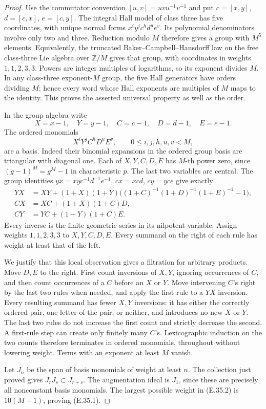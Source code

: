 \begin{proof}
Use the commutator convention $[u,v]=uvu^{-1}v^{-1}$ and put
$c=[x,y]$, $d=[c,x]$, $e=[c,y]$.  The integral Hall model of class
three has five coordinates, with unique normal forms
$x^iy^jc^hd^ue^v$.  Its polynomial denominators involve only two and
three.  Reduction modulo $M$ therefore gives a group with $M^5$
elements.  Equivalently, the truncated Baker--Campbell--Hausdorff
law on the free class-three Lie algebra over $\mathbb Z/M$ gives
that group, with coordinates in weights $1,1,2,3,3$.  Powers are
integer multiples of logarithms, so its exponent divides $M$.
In any class-three exponent-$M$ group, the five Hall generators have
orders dividing $M$; hence every word whose Hall exponents are
multiples of $M$ maps to the identity.  This proves the asserted
universal property as well as the order.

In the group algebra write
\[
 X=x-1,\quad Y=y-1,\quad C=c-1,\quad D=d-1,\quad E=e-1.
\]
The ordered monomials
\[
 X^iY^jC^hD^uE^v,\qquad 0\le i,j,h,u,v<M,
 \tag{E.35.2}
\]
are a basis.  Indeed their binomial expansions in the ordered group
basis are triangular with diagonal one.  Each of $X,Y,C,D,E$ has
$M$-th power zero, since $(g-1)^M=g^M-1$ in characteristic $p$.
The last two variables are central.  The group identities
$yx=xyc^{-1}d^{-1}e^{-1}$, $cx=xcd$, $cy=yce$ give exactly
\[
\begin{aligned}
 YX&=XY+(1+X)(1+Y)
       \big((1+C)^{-1}(1+D)^{-1}(1+E)^{-1}-1\big),\\
 CX&=XC+(1+X)(1+C)D,\\
 CY&=YC+(1+Y)(1+C)E.
\end{aligned}
 \tag{E.35.3}
\]
Every inverse is the finite geometric series in its nilpotent
variable.  Assign weights $1,1,2,3,3$ to $X,Y,C,D,E$.  Every
summand on the right of each rule has weight at least that of the
left.

We justify that this local observation gives a filtration for
arbitrary products.  Move $D,E$ to the right.  First count inversions
of $X,Y$, ignoring occurrences of $C$, and then count occurrences
of a $C$ before an $X$ or $Y$.  Move intervening $C$'s right by the
last two rules when needed, and apply the first rule to a $YX$
inversion.  Every resulting summand has fewer $X,Y$ inversions:
it has either the correctly ordered pair, one letter of the pair,
or neither, and introduces no new $X$ or $Y$.  The last two rules
do not increase the first count and strictly decrease the second.
A first-rule step can create only finitely many $C$'s.  Lexicographic
induction on the two counts therefore terminates in ordered
monomials, throughout without lowering weight.  Terms with an
exponent at least $M$ vanish.

Let $J_n$ be the span of basis monomials of weight at least $n$.
The collection just proved gives $J_rJ_s\subset J_{r+s}$.
The augmentation ideal is $J_1$, since these are precisely all
nonconstant basis monomials.  The largest possible weight in
(E.35.2) is $10(M-1)$, proving (E.35.1).
\end{proof}


